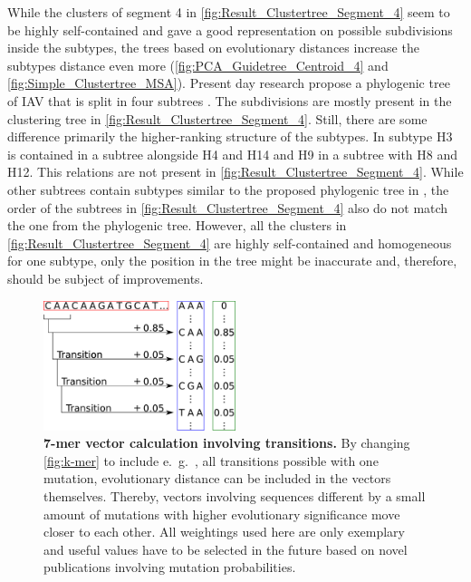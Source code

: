 While the clusters of segment 4 in \autoref{fig:Result_Clustertree_Segment_4} seem to be highly self-contained and gave a good representation on possible subdivisions inside the subtypes, the trees based on evolutionary distances increase the subtypes distance even more (\autoref{fig:PCA_Guidetree_Centroid_4} and \autoref{fig:Simple_Clustertree_MSA}). Present day research propose a phylogenic tree of \gls{IAV} that is split in four subtrees \autocite{wei_next-generation_2020}. The subdivisions are mostly present in the clustering tree in \autoref{fig:Result_Clustertree_Segment_4}. Still, there are some difference primarily the higher-ranking structure of the subtypes. In \textcite{wei_next-generation_2020} subtype H3 is contained in a subtree alongside H4 and H14 and H9 in a subtree with H8 and H12. This relations are not present in \autoref{fig:Result_Clustertree_Segment_4}. While other subtrees contain subtypes similar to the proposed phylogenic tree in \textcite{wei_next-generation_2020}, the order of the subtrees in \autoref{fig:Result_Clustertree_Segment_4} also do not match the one from the phylogenic tree. However, all the clusters in \autoref{fig:Result_Clustertree_Segment_4} are highly self-contained and homogeneous for one subtype, only the position in the tree might be inaccurate and, therefore, should be subject of improvements.  

\vspace{1em}

\begin{figure}[!hbt]
    \centering
    \includegraphics[width=0.5\textwidth]{Graphics/Transition.pdf}
    \caption[7-mer vector calculation involving transitions]{\textbf{7-mer vector calculation involving transitions.} By changing \autoref{fig:k-mer} to include e.~g.~, all transitions possible with one mutation, evolutionary distance can be included in the vectors themselves. Thereby, vectors involving sequences different by a small amount of mutations with higher evolutionary significance move closer to each other. All weightings used here are only exemplary and useful values have to be selected in the future based on novel publications  involving mutation probabilities.}
    \label{fig:trans}
\end{figure}

